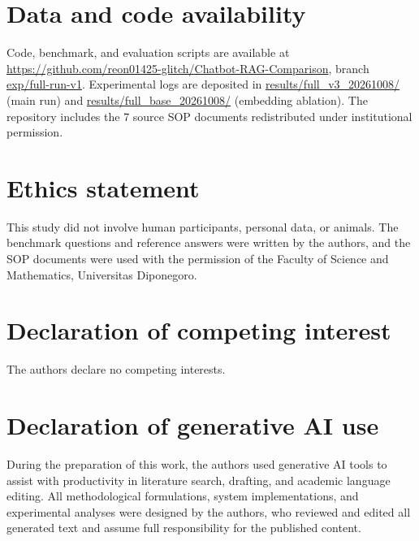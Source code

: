 \documentclass[a4paper,fleqn]{cas-dc}
\begin{document}
\section*{Data and code availability}
Code, benchmark, and evaluation scripts are available at \url{https://github.com/reon01425-glitch/Chatbot-RAG-Comparison}, branch \url{exp/full-run-v1}. Experimental logs are deposited in \url{results/full_v3_20261008/} (main run) and \url{results/full_base_20261008/} (embedding ablation). The repository includes the 7 source SOP documents redistributed under institutional permission.

\printcredits

\section*{Ethics statement}
This study did not involve human participants, personal data, or animals. The benchmark questions and reference answers were written by the authors, and the SOP documents were used with the permission of the Faculty of Science and Mathematics, Universitas Diponegoro.

\section*{Declaration of competing interest}
The authors declare no competing interests.

\section*{Declaration of generative AI use}
During the preparation of this work, the authors used generative AI tools to assist with productivity in literature search, drafting, and academic language editing. All methodological formulations, system implementations, and experimental analyses were designed by the authors, who reviewed and edited all generated text and assume full responsibility for the published content.
\end{document}
